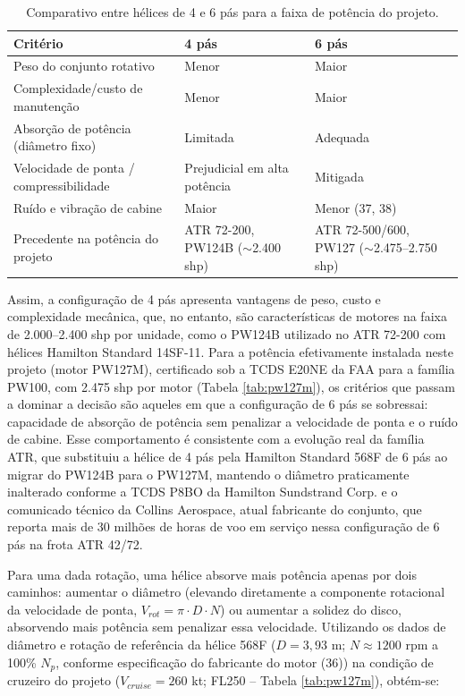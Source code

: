 \begin{table}[H]
  \centering
  \linespread{1}\small
  \setlength{\tabcolsep}{4pt}
  \caption{Comparativo entre hélices de 4 e 6 pás para a faixa de potência do projeto.}
  \label{tab:comparativo_pas}
  \begin{tabularx}{\textwidth}{L L L}
    \toprule
    \textbf{Critério} & \textbf{4 pás} & \textbf{6 pás} \\
    \midrule
    Peso do conjunto rotativo & Menor & Maior \\
    Complexidade/custo de manutenção & Menor & Maior \\
    Absorção de potência (diâmetro fixo) & Limitada & Adequada \\
    Velocidade de ponta / compressibilidade & Prejudicial em alta potência & Mitigada \\
    Ruído e vibração de cabine & Maior & Menor (37, 38) \\
    Precedente na potência do projeto & ATR 72-200, PW124B ($\sim$2.400 shp) & ATR 72-500/600, PW127 ($\sim$2.475--2.750 shp) \\
    \bottomrule
  \end{tabularx}
\end{table}

Assim, a configuração de 4 pás apresenta vantagens de peso, custo e complexidade mecânica, que, no entanto, são características de motores na faixa de 2.000--2.400 shp por unidade, como o PW124B utilizado no ATR 72-200 com hélices Hamilton Standard 14SF-11. Para a potência efetivamente instalada neste projeto (motor PW127M), certificado sob a TCDS E20NE da FAA para a família PW100, com 2.475 shp por motor (Tabela \ref{tab:pw127m}), os critérios que passam a dominar a decisão são aqueles em que a configuração de 6 pás se sobressai: capacidade de absorção de potência sem penalizar a velocidade de ponta e o ruído de cabine. Esse comportamento é consistente com a evolução real da família ATR, que substituiu a hélice de 4 pás pela Hamilton Standard 568F de 6 pás ao migrar do PW124B para o PW127M, mantendo o diâmetro praticamente inalterado conforme a TCDS P8BO da Hamilton Sundstrand Corp. e o comunicado técnico da Collins Aerospace, atual fabricante do conjunto, que reporta mais de 30 milhões de horas de voo em serviço nessa configuração de 6 pás na frota ATR 42/72.

Para uma dada rotação, uma hélice absorve mais potência apenas por dois caminhos: aumentar o diâmetro (elevando diretamente a componente rotacional da velocidade de ponta, $V_{rot} = \pi \cdot D \cdot N$) ou aumentar a solidez do disco, absorvendo mais potência sem penalizar essa velocidade. Utilizando os dados de diâmetro e rotação de referência da hélice 568F ($D = 3{,}93$ m; $N \approx 1200$ rpm a 100\% $N_p$, conforme especificação do fabricante do motor (36)) na condição de cruzeiro do projeto ($V_{cruise} = 260$ kt; FL250 -- Tabela \ref{tab:pw127m}), obtém-se:

